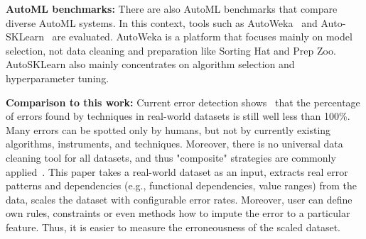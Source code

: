 \textbf{AutoML benchmarks:} 
There are also AutoML benchmarks that compare diverse AutoML systems.
In this context, tools such as AutoWeka~\cite{autoweka} and Auto-SKLearn~\cite{autosklearn} are evaluated.
AutoWeka is a platform that focuses mainly on model selection, not data cleaning and preparation like Sorting Hat and Prep Zoo.
AutoSKLearn also mainly concentrates on algorithm selection and hyperparameter tuning.

\textbf{Comparison to this work:} 
Current error detection shows~\cite{errors, cleanml} that the percentage of errors found by techniques in real-world datasets is still well less than 100\%. 
Many errors can be spotted only by humans, but not by currently existing algorithms, instruments, and techniques.
Moreover, there is no universal data cleaning tool for all datasets, and thus "composite" strategies are commonly applied~\cite{errors}.
This paper takes a real-world dataset as an input, extracts real error patterns and dependencies (e.g., functional dependencies, value ranges) from the data, scales the dataset with configurable error rates. 
Moreover, user can define own rules, constraints or even methods how to impute the error to a particular feature.
Thus, it is easier to measure the erroneousness of the scaled dataset. 





